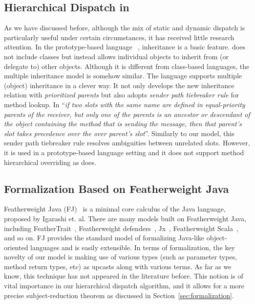 \subsection{Hierarchical Dispatch in \self{}}
As we have discussed before, although the mix of static and dynamic dispatch is 
particularly useful under certain circumstances, it has received little research attention. 
In the prototype-based language \self{}~\cite{Chambers1991}, inheritance is a basic feature.
\self{} does not include classes but instead allows individual objects to inherit from (or delegate to) other objects. 
Although it is different from class-based languages, the multiple inheritance model is somehow similar. The \self{}
language supports multiple (object) inheritance in a clever way. It not only develops the new inheritance
relation with \emph{prioritized parents} but also adopts \emph{sender path tiebreaker rule} for method lookup.
In \self{} ``\emph{if two slots with the same name are defined in equal-priority parents of the receiver, but only 
one of the parents is an ancestor or descendant of the object containing the method that is sending the message,
then that parent's slot takes precedence over the over parent's slot}''. 
Similarly to our model, this sender path tiebreaker rule resolves ambiguities between unrelated slots. However,
it is used in a prototype-based language setting and it does not support method hierarchical overriding as \MIM{} does.

\subsection{Formalization Based on Featherweight Java}
Featherweight Java (FJ)~\cite{Igarashi01FJ} is a minimal core calculus of the Java language, 
proposed by Igarashi et. al. There are many models built on Featherweight Java, 
including FeatherTrait~\cite{Liquori08ftj}, Featherweight defenders~\cite{goetz12fdefenders}, Jx~\cite{Nystrom2004}, 
Featherweight Scala~\cite{Cremet2006}, and so on.
FJ provides the standard model of formalizing Java-like object-oriented languages and 
is easily extensible. In terms of formalization, the key novelty of our model is making use of various types (such as parameter types, method return types, etc) as upcasts along with various terms. As far as we know, this technique has not appeared in the literature before. This notion is of vital importance in our hierarchical dispatch algorithm, and it allows for a
more precise subject-reduction theorem as discussed in
Section~\ref{sec:formalization}.








